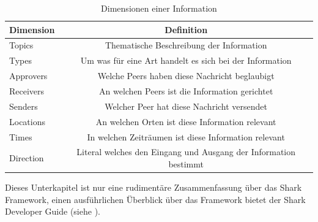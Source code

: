 \begin{table}[H]
	\begin{center}
		\caption{Dimensionen einer Information}
		\label{tab:dimensions}
		\begin{tabular}{l|c} 			
			Dimension & Definition \\
			\hline
			Topics & Thematische Beschreibung der Information\\
			Types & Um was für eine Art handelt es sich bei der Information\\
			Approvers & Welche Peers haben diese Nachricht beglaubigt\\
			Receivers & An welchen Peers ist die Information gerichtet\\
			Senders & Welcher Peer hat diese Nachricht versendet\\
			Locations & An welchen Orten ist diese Information relevant\\
			Times & In welchen Zeiträumen ist diese Information relevant\\
			Direction & Literal welches den Eingang und Ausgang der Information bestimmt\\
		\end{tabular}
	\end{center}
\end{table}
Dieses Unterkapitel ist nur eine rudimentäre Zusammenfassung über das Shark Framework, einen ausführlichen Überblick über das Framework bietet der Shark Developer \mbox{Guide} (siehe \citet[S. 7ff]{Schwotzer2014}).
